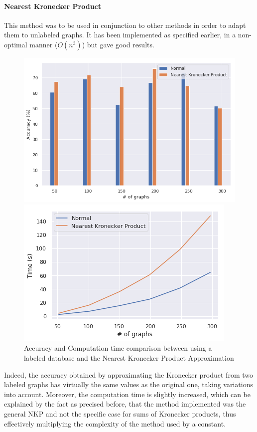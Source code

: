\documentclass{article}
\theoremstyle{definition}
\begin{document}
\paragraph{Nearest Kronecker Product}
This method was to be used in conjunction to other methods in order to adapt them to unlabeled graphs. It has been implemented as specified earlier, in a non-optimal manner ($O(n^3)$) but gave good results. 
\begin{figure}[!htb]
	\begin{multicols}{2}
		\includegraphics[width=\linewidth]{data/nkp/acc.png}\par
		\includegraphics[width=\linewidth]{data/nkp/time.png}\par
	\end{multicols}
\caption{Accuracy and Computation time comparison between using a labeled database and the Nearest Kronecker Product Approximation}
\end{figure}Indeed, the accuracy obtained by approximating the Kronecker product from two labeled graphs has virtually the same values as the original one, taking variations into account. Moreover, the computation time is slightly increased, which can be explained by the fact as precised before, that the method implemented was the general NKP and not the specific case for sums of Kronecker products, thus effectively multiplying the complexity of the method used by a constant.\\
\end{document}
